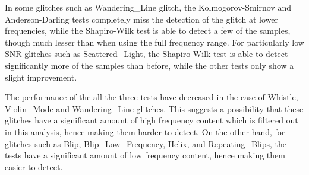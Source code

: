 \documentclass[12pt]{article}
\begin{document}
\medskip
\noindent In some glitches such as Wandering\_Line glitch, the Kolmogorov-Smirnov and Anderson-Darling tests completely miss the detection of the glitch at lower frequencies, while the Shapiro-Wilk test is able to detect a few of the samples, though much lesser than when using the full frequency range. For particularly low SNR glitches such as Scattered\_Light, the Shapiro-Wilk test is able to detect significantly more of the samples than before, while the other tests only show a slight improvement.

\medskip
\noindent The performance of the all the three tests have decreased in the case of Whistle, Violin\_Mode and Wandering\_Line glitches. This suggests a possibility that these glitches have a significant amount of high frequency content which is filtered out in this analysis, hence making them harder to detect. On the other hand, for glitches such as Blip, Blip\_Low\_Frequency, Helix, and Repeating\_Blips, the tests have a significant amount of low frequency content, hence making them easier to detect.
\end{document}
